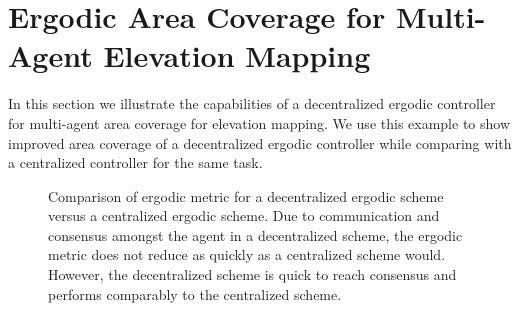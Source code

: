 \documentclass[letterpaper, 10 pt, conference]{ieeeconf}  %
\begin{document}
\section{Ergodic Area Coverage for Multi-Agent Elevation Mapping}
\label{sec:terrain-mapping-using-ergodic-area-coverage}
In this section we illustrate the capabilities of a decentralized ergodic controller for multi-agent area coverage for elevation mapping.
We use this example to show improved area coverage of a decentralized ergodic controller while comparing with a centralized controller for the same task.


\begin{figure}[thpb]
\centering
{}
\caption{Comparison of ergodic metric for a decentralized ergodic scheme versus a centralized ergodic scheme. 
Due to communication and consensus amongst the agent in a decentralized scheme, the ergodic metric does not reduce as quickly as a centralized scheme would.
However, the decentralized scheme is quick to reach consensus and performs comparably to the centralized scheme.}
\label{fig:coverage_comparison}
\end{figure}

\end{document}
